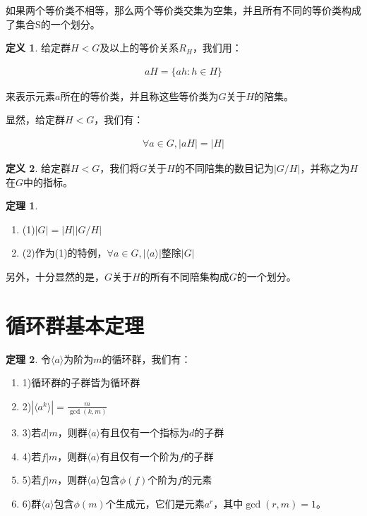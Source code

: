 \documentclass[12pt, a4paper, oneside]{ctexart}
\theoremstyle{definition}
\newtheorem*{definition}{定义}
\newtheorem*{theorem}{定理}
\begin{document}
如果两个等价类不相等，那么两个等价类交集为空集，并且所有不同的等价类构成了集合S的一个划分。

\begin{definition}
给定群$H<G$及以上的等价关系$R_H$，我们用：

\begin{align*}
	aH=\{ah:h\in H\}
\end{align*}

来表示元素$a$所在的等价类，并且称这些等价类为$G$关于$H$的陪集。
\end{definition}

显然，给定群$H<G$，我们有：

\begin{align*}
	\forall a\in G,|aH|=|H|
\end{align*}

\begin{definition}
给定群$H<G$，我们将$G$关于$H$的不同陪集的数目记为$|G/H|$，并称之为$H$在$G$中的指标。
\end{definition}

\begin{theorem}

\begin{enumerate}
	\item (1)$|G|=|H||G/H|$
	\item (2)作为(1)的特例，$\forall a\in G,|\langle a \rangle|$整除$|G|$
\end{enumerate}
\end{theorem}
另外，十分显然的是，$G$关于$H$的所有不同陪集构成$G$的一个划分。

\section*{循环群基本定理}

\begin{theorem}
令$\langle a \rangle$为阶为$m$的循环群，我们有：
\begin{enumerate}
	\item 1)循环群的子群皆为循环群
	\item 2)$|\langle a^k \rangle|=\frac{m}{\gcd(k,m)}$
	\item 3)若$d|m$，则群$\langle a \rangle$有且仅有一个指标为$d$的子群
	\item 4)若$f|m$，则群$\langle a \rangle$有且仅有一个阶为$f$的子群
	\item 5)若$f|m$，则群$\langle a \rangle$包含$\phi(f)$个阶为$f$的元素
	\item 6)群$\langle a \rangle$包含$\phi(m)$个生成元，它们是元素$a^r$，其中$\gcd(r,m)=1$。
\end{enumerate}
\end{theorem}
\end{document}
